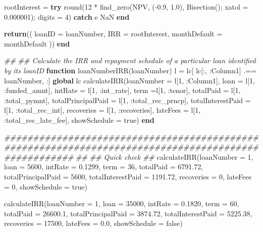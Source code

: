 \documentclass[11pt,]{report}
\newenvironment{Shaded}{\begin{snugshade}}{\end{snugshade}}
\newcommand{\CommentTok}[1]{\textcolor[rgb]{0.56,0.35,0.01}{\textit{#1}}}
\newcommand{\FloatTok}[1]{\textcolor[rgb]{0.00,0.00,0.81}{#1}}
\newcommand{\KeywordTok}[1]{\textcolor[rgb]{0.13,0.29,0.53}{\textbf{#1}}}
\newcommand{\NormalTok}[1]{#1}
\begin{document}
\begin{Shaded}
\begin{Highlighting}[numbers=left,,]
\NormalTok{  rootInterest = }\KeywordTok{try}
\NormalTok{                  round(}\FloatTok{12}\NormalTok{ * find_zero(NPV, (-}\FloatTok{0.9}\NormalTok{, }\FloatTok{1.0}\NormalTok{), Bisection(); xatol = }\FloatTok{0.000001}\NormalTok{); digits = }\FloatTok{4}\NormalTok{)}
                \KeywordTok{catch}\NormalTok{ e}
\NormalTok{                  NaN}
                \KeywordTok{end}

  \KeywordTok{return}\NormalTok{((}
\NormalTok{    loanID = loanNumber,}
\NormalTok{    IRR = rootInterest,}
\NormalTok{    monthDefault = monthDefault}
\NormalTok{  ))}
\KeywordTok{end}


\CommentTok{##}
\CommentTok{## Calculate the IRR and repayment schedule of a particular loan identified by its loanID}
\KeywordTok{function}\NormalTok{ loanNumberIRR(loanNumber)}
\NormalTok{  l = lc[ lc[:, :Column1] .== loanNumber, :]}
  \KeywordTok{global}\NormalTok{ lc}
\NormalTok{  calculateIRR(loanNumber = l[}\FloatTok{1}\NormalTok{, :Column1],}
\NormalTok{               loan = l[}\FloatTok{1}\NormalTok{, :funded_amnt], intRate = l[}\FloatTok{1}\NormalTok{, :int_rate], term =l[}\FloatTok{1}\NormalTok{, :tenor],}
\NormalTok{               totalPaid = l[}\FloatTok{1}\NormalTok{, :total_pymnt], totalPrincipalPaid = l[}\FloatTok{1}\NormalTok{, :total_rec_prncp],}
\NormalTok{               totalInterestPaid = l[}\FloatTok{1}\NormalTok{, :total_rec_int],}
\NormalTok{               recoveries = l[}\FloatTok{1}\NormalTok{, :recoveries], lateFees = l[}\FloatTok{1}\NormalTok{, :total_rec_late_fee],}
\NormalTok{               showSchedule = true)}
\KeywordTok{end}


\CommentTok{####################################################################################################}
\CommentTok{##}
\CommentTok{## Quick check}
\CommentTok{##}
\NormalTok{calculateIRR(loanNumber = }\FloatTok{1}\NormalTok{, loan = }\FloatTok{5600}\NormalTok{, intRate = }\FloatTok{0.1299}\NormalTok{, term = }\FloatTok{36}\NormalTok{,}
\NormalTok{             totalPaid = }\FloatTok{6791.72}\NormalTok{, totalPrincipalPaid = }\FloatTok{5600}\NormalTok{, totalInterestPaid = }\FloatTok{1191.72}\NormalTok{,}
\NormalTok{             recoveries = }\FloatTok{0}\NormalTok{, lateFees = }\FloatTok{0}\NormalTok{,}
\NormalTok{             showSchedule = true)}

\NormalTok{calculateIRR(loanNumber = }\FloatTok{1}\NormalTok{, loan = }\FloatTok{35000}\NormalTok{, intRate = }\FloatTok{0.1820}\NormalTok{, term = }\FloatTok{60}\NormalTok{,}
\NormalTok{             totalPaid = }\FloatTok{26600.1}\NormalTok{, totalPrincipalPaid = }\FloatTok{3874.72}\NormalTok{, totalInterestPaid = }\FloatTok{5225.38}\NormalTok{,}
\NormalTok{             recoveries = }\FloatTok{17500}\NormalTok{, lateFees = }\FloatTok{0.0}\NormalTok{,}
\NormalTok{             showSchedule = false)}


\end{Highlighting}
\end{Shaded}
\end{document}
